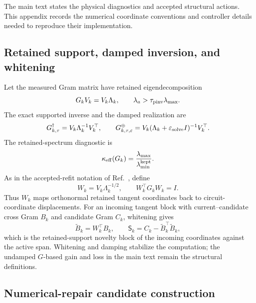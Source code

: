 \documentclass[
  reprint,
  amsmath,
  amssymb,
  aps,
  pra,
  nofootinbib,
  superscriptaddress,
  floatfix
]{revtex4-2}
\newcommand{\eps}{\varepsilon}
\begin{document}
The main text states the physical diagnostics and accepted structural actions.  This appendix records the numerical coordinate conventions and controller details needed to reproduce their implementation.

\subsection{Retained support, damped inversion, and whitening}

Let the measured Gram matrix have retained eigendecomposition
\begin{equation}
G_kV_k=V_k\Lambda_k,
\qquad
\lambda_a>\tau_{\rm pinv}\lambda_{\max}.
\label{eq:app_retained_support}
\end{equation}
The exact supported inverse and the damped realization are
\begin{equation}
G_{k,\tau}^{\dagger}
=V_k\Lambda_k^{-1}V_k^\top,
\qquad
G_{k,\tau,\eps}^{\oplus}
=V_k(\Lambda_k+\eps_{\rm solve}I)^{-1}V_k^\top.
\label{eq:app_supported_inverse}
\end{equation}
The retained-spectrum diagnostic is
\begin{equation}
\kappa_{\rm eff}(G_k)
=\frac{\lambda_{\max}}{\lambda_{\min}^{\rm kept}}.
\label{eq:app_kappa_eff}
\end{equation}
As in the accepted-refit notation of Ref.~\cite{Strobel2026StaticAdapt}, define
\begin{equation}
W_k=V_k\Lambda_k^{-1/2},
\qquad
W_k^\top G_kW_k=I.
\label{eq:app_whitening}
\end{equation}
Thus \(W_k\) maps orthonormal retained tangent coordinates back to circuit-coordinate displacements.  For an incoming tangent block with current--candidate cross Gram \(B_k\) and candidate Gram \(C_k\), whitening gives
\begin{equation}
\widetilde B_k=W_k^\top B_k,
\qquad
\mathsf S_k=C_k-\widetilde B_k^\top\widetilde B_k,
\label{eq:app_whitened_schur}
\end{equation}
which is the retained-support novelty block of the incoming coordinates against the active span.  Whitening and damping stabilize the computation; the undamped \(G\)-based gain and loss in the main text remain the structural definitions.

\subsection{Numerical-repair candidate construction}
\end{document}
